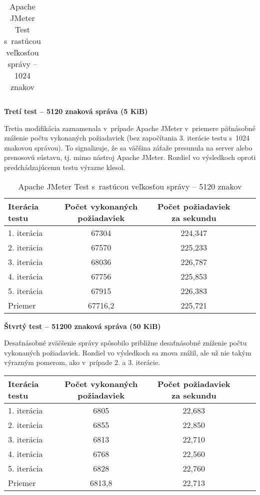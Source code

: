\documentclass[12pt,oneside,final]{fithesis-utf8}
\begin{document}
\begin{itemize}
\begin{table}[H]
\begin{center}
\begin{tabular}{ | l | c | c | c | c |}
\end{tabular}
\end{center}
\caption{Apache JMeter Test s~rastúcou veľkosťou správy -- 1024 znakov}
\end{table}


\textbf{Tretí test -- 5120 znaková správa (5 KiB)}

Tretia modifikácia zaznamenala v~prípade Apache JMeter v~priemere päťnásobné zníženie počtu vykonaných požiadaviek (bez započítania 3. iterácie testu s~1024 znakovou správou). To signalizuje, že sa väčšina záťaže presunula na server alebo prenosovú sústavu, tj. mimo nástroj Apache JMeter. Rozdiel vo výsledkoch oproti predchádzajúcemu testu výrazne klesol.

\begin{table}[H]
\begin{center}
\begin{tabular}{ | l | c | c | c | c |}
		\hline
		 \textbf{Iterácia testu} & \textbf{Počet vykonaných požiadaviek} & \textbf{Počet požiadaviek za sekundu} \\ \hline
		 1. iterácia & 67304 & 224,347 \\ \hline
		 2. iterácia & 67570 & 225,233 \\ \hline
		 3. iterácia & 68036 & 226,787 \\ \hline
		 4. iterácia & 67756 & 225,853 \\ \hline
		 5. iterácia & 67915 & 226,383 \\ \hline
		 Priemer & 67716,2 & 225,721 \\ \hline
		 
\end{tabular}
\end{center}
\caption{Apache JMeter Test s~rastúcou veľkosťou správy -- 5120 znakov}
\end{table}


\textbf{Štvrtý test -- 51200 znaková správa (50 KiB)}

Desaťnásobné zväčšenie správy spôsobilo približne desaťnásobné zníženie počtu vykonaných požiadaviek. Rozdiel vo výsledkoch sa znova znížil, ale už nie takým výrazným pomerom, ako v~prípade 2. a 3. iterácie.

\begin{table}[H]
\begin{center}
\begin{tabular}{ | l | c | c | c | c |}
		\hline
		 \textbf{Iterácia testu} & \textbf{Počet vykonaných požiadaviek} & \textbf{Počet požiadaviek za sekundu} \\ \hline
		 1. iterácia & 6805 & 22,683 \\ \hline
		 2. iterácia & 6855 & 22,850 \\ \hline
		 3. iterácia & 6813 & 22,710 \\ \hline
		 4. iterácia & 6768 & 22,560 \\ \hline
		 5. iterácia & 6828 & 22,760 \\ \hline
		 Priemer & 6813,8 & 22,713 \\ \hline
		 

\end{tabular}
\end{center}
\end{table}
\end{itemize}
\end{document}
